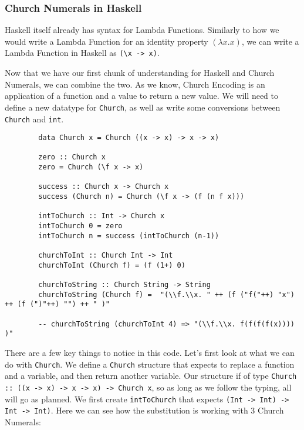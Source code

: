 \documentclass{article}
\begin{document}
        \subsubsection{Church Numerals in Haskell}
        Haskell itself already has syntax for Lambda Functions. Similarly to how we would write a Lambda Function for an identity property $(\lambda x. x)$, we can write a Lambda Function in Haskell as \lstinline{(\x -> x)}.
        
        \medskip\noindent
        Now that we have our first chunk of understanding for Haskell and Church Numerals, we can combine the two. As we know, Church Encoding is an application of a function and a value to return a new value. We will need to define a new datatype for \lstinline{Church}, as well as write some conversions between \lstinline{Church} and \lstinline{int}.
        
        \begin{lstlisting}
        data Church x = Church ((x -> x) -> x -> x)

        zero :: Church x
        zero = Church (\f x -> x)
        
        success :: Church x -> Church x
        success (Church n) = Church (\f x -> (f (n f x)))
        
        intToChurch :: Int -> Church x
        intToChurch 0 = zero
        intToChurch n = success (intToChurch (n-1))
        
        churchToInt :: Church Int -> Int
        churchToInt (Church f) = (f (1+) 0)
        
        churchToString :: Church String -> String
        churchToString (Church f) =  "(\\f.\\x. " ++ (f ("f("++) "x") ++ (f (")"++) "") ++ " )"
        
        -- churchToString (churchToInt 4) => "(\\f.\\x. f(f(f(f(x)))) )"
        \end{lstlisting}
        
        \medskip\noindent
        There are a few key things to notice in this code. Let's first look at what we can do with \lstinline{Church}. We define a \lstinline{Church} structure that expects to replace a function and a variable, and then return another variable. Our structure if of type \lstinline{Church :: ((x -> x) -> x -> x) -> Church x}, so as long as we follow the typing, all will go as planned. We first create \lstinline{intToChurch} that expects \lstinline{(Int -> Int) -> Int -> Int)}. Here we can see how the substitution is working with 3 Church Numerals:
        
\end{document}
